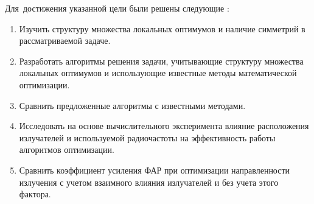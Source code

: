 Для~достижения указанной цели были решены следующие {\tasks}:
\begin{enumerate}[beginpenalty=10000] %
  \item Изучить структуру множества локальных оптимумов и наличие симметрий в рассматриваемой задаче.
  \item Разработать алгоритмы решения задачи, учитывающие структуру множества локальных оптимумов и использующие известные методы математической оптимизации.
  \item Сравнить предложенные алгоритмы с известными методами.
  \item Исследовать на основе вычислительного эксперимента влияние расположения излучателей и используемой радиочастоты на эффективность работы алгоритмов оптимизации.
  \item Сравнить коэффициент усиления ФАР при оптимизации направленности излучения с учетом взаимного влияния излучателей и без учета этого фактора.
\end{enumerate}


{\novelty}


